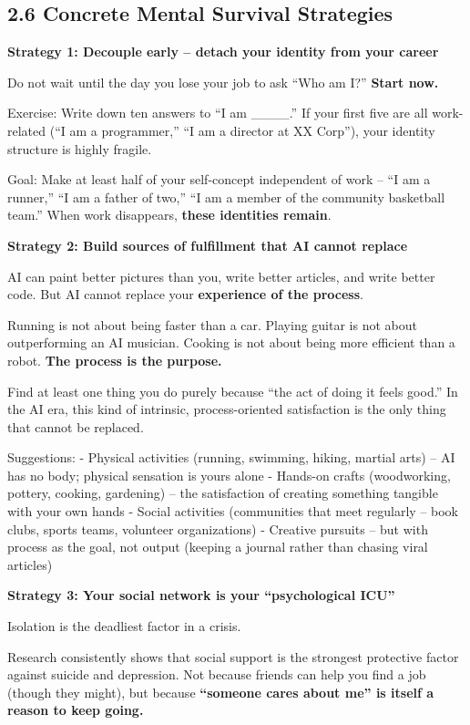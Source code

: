 \subsection{2.6 Concrete Mental Survival
Strategies}\label{concrete-mental-survival-strategies}

\textbf{Strategy 1: Decouple early -- detach your identity from your
career}

Do not wait until the day you lose your job to ask ``Who am I?''
\textbf{Start now.}

Exercise: Write down ten answers to ``I am \_\_\_\_.'' If your first
five are all work-related (``I am a programmer,'' ``I am a director at
XX Corp''), your identity structure is highly fragile.

Goal: Make at least half of your self-concept independent of work -- ``I
am a runner,'' ``I am a father of two,'' ``I am a member of the
community basketball team.'' When work disappears, \textbf{these
identities remain}.

\textbf{Strategy 2: Build sources of fulfillment that AI cannot replace}

AI can paint better pictures than you, write better articles, and write
better code. But AI cannot replace your \textbf{experience of the
process}.

Running is not about being faster than a car. Playing guitar is not
about outperforming an AI musician. Cooking is not about being more
efficient than a robot. \textbf{The process is the purpose.}

Find at least one thing you do purely because ``the act of doing it
feels good.'' In the AI era, this kind of intrinsic, process-oriented
satisfaction is the only thing that cannot be replaced.

Suggestions: - Physical activities (running, swimming, hiking, martial
arts) -- AI has no body; physical sensation is yours alone - Hands-on
crafts (woodworking, pottery, cooking, gardening) -- the satisfaction of
creating something tangible with your own hands - Social activities
(communities that meet regularly -- book clubs, sports teams, volunteer
organizations) - Creative pursuits -- but with process as the goal, not
output (keeping a journal rather than chasing viral articles)

\textbf{Strategy 3: Your social network is your ``psychological ICU''}

Isolation is the deadliest factor in a crisis.

Research consistently shows that social support is the strongest
protective factor against suicide and depression. Not because friends
can help you find a job (though they might), but because
\textbf{``someone cares about me'' is itself a reason to keep going.}

